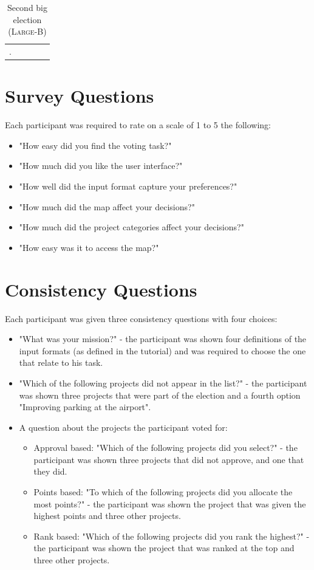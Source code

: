 \documentclass[runningheads]{llncs}
\begin{document}
\begin{longtable}[ht!]{|p{2cm}|p{6cm}|p{3cm}|p{1cm}|p{2.5cm}|}
     \hline
  \caption{Second big election (\textsc{Large-B})}\label{tab:fourth_elc}.
\end{longtable}


\section{Survey Questions}
Each participant was required to rate on a scale of 1 to 5 the following:

\begin{itemize}
    \item "How easy did you find the voting task?"
    \item "How much did you like the user interface?"
    \item "How well did the input format capture your preferences?"
    \item "How much did the map affect your decisions?"
    \item "How much did the project categories affect your decisions?"
    \item "How easy was it to access the map?"
\end{itemize}

\section{Consistency Questions}
Each participant was given three consistency questions with four choices:
\begin{itemize}
    \item "What was your mission?" - the participant was shown four definitions of the input formats (as defined in the tutorial) and was required to choose the one that relate to his task.
    \item "Which of the following projects did not appear in the list?" - the participant was shown three projects that were part of the election and a fourth option "Improving parking at the airport". 
    \item A question about the projects the participant voted for:
    \begin{itemize}
        \item Approval based: "Which of the following projects did you select?" - the participant was shown three projects that did not approve, and one that they did. 
        \item Points based: "To which of the following projects did you allocate the most points?" - the participant was shown the project that was given the highest points and three other projects.
        \item Rank based: "Which of the following projects did you rank the highest?" - the participant was shown the project that was ranked at the top and three other projects.
    \end{itemize}
\end{itemize}
\end{document}
